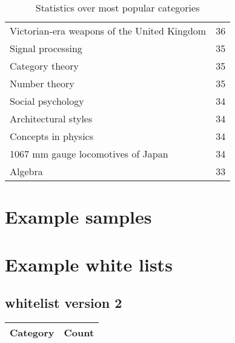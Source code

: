 \begin{appendices}
\begin{table}[h!]
\begin{tabular} {|| p{20em} | p{5em} ||}
Victorian-era weapons of the United Kingdom & 36 \\
Signal processing & 35 \\
Category theory & 35 \\
Number theory & 35 \\
Social psychology & 34 \\
Architectural styles & 34 \\
Concepts in physics & 34 \\
1067 mm gauge locomotives of Japan & 34 \\
Algebra & 33 \\
 \hline
\end{tabular}
\caption{Statistics over most popular categories}
\label{table:A.1}
\end{table}

\chapter{Example samples} \label{app_example}




\chapter{Example white lists} \label{app_whitelist}

\section{whitelist version 2}

\centering
\begin{longtable} {|| p{20em} | p{5em} ||} 
 \hline
 Category & Count \\ [0.5ex] 
 \hline
 

\end{longtable}
\end{appendices}
